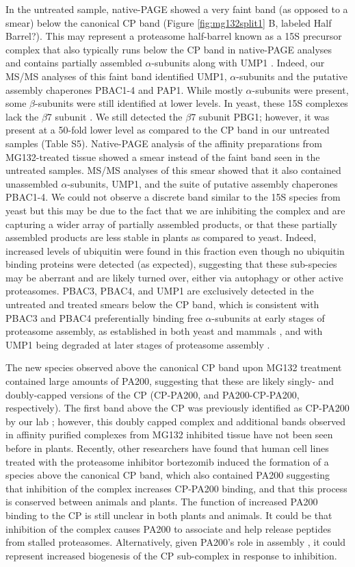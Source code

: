 In the untreated sample, native-PAGE showed a very faint band (as opposed to a smear) below the canonical CP band (Figure \ref{fig:mg132split1} B, labeled Half Barrel?). This may represent a proteasome half-barrel known as a 15S precursor complex that also typically runs below the CP band in native-PAGE analyses and contains partially assembled $\alpha$-subunits along with UMP1 \citep{kock15}. Indeed, our MS/MS analyses of this faint band identified UMP1, $\alpha$-subunits and the putative assembly chaperones PBAC1-4 and PAP1. While mostly $\alpha$-subunits were present, some $\beta$-subunits were still identified at lower levels. In yeast, these 15S complexes lack the $\beta$7 subunit \citep{kock15}. We still detected the $\beta$7 subunit PBG1; however, it was present at a 50-fold lower level as compared to the CP band in our untreated samples (Table S5). Native-PAGE analysis of the affinity preparations from MG132-treated tissue showed a smear instead of the faint band seen in the untreated samples. MS/MS analyses of this smear showed that it also contained unassembled $\alpha$-subunits, UMP1, and the suite of putative assembly chaperones PBAC1-4. We could not observe a discrete band similar to the 15S species from yeast but this may be due to the fact that we are inhibiting the complex and are capturing a wider array of partially assembled products, or that these partially assembled products are less stable in plants as compared to yeast. Indeed, increased levels of ubiquitin were found in this fraction even though no ubiquitin binding proteins were detected (as expected), suggesting that these sub-species may be aberrant and are likely turned over, either via autophagy or other active proteasomes. PBAC3, PBAC4, and UMP1 are exclusively detected in the untreated and treated smears below the CP band, which is consistent with PBAC3 and PBAC4 preferentially binding free $\alpha$-subunits at early stages of proteasome assembly, as established in both yeast and mammals \citep{kunjappu14}, and with UMP1 being degraded at later stages of proteasome assembly \citep{ramos98}.

	The new species observed above the canonical CP band upon MG132 treatment contained large amounts of PA200, suggesting that these are likely singly- and doubly-capped versions of the CP (CP-PA200, and PA200-CP-PA200, respectively). The first band above the CP was previously identified as CP-PA200 by our lab \citep{book10}; however, this doubly capped complex and additional bands observed in affinity purified complexes from MG132 inhibited tissue have not been seen before in plants. Recently, other researchers have found that human cell lines treated with the proteasome inhibitor bortezomib induced the formation of a species above the canonical CP band, which also contained PA200 \citep{welk16} suggesting that inhibition of the complex increases CP-PA200 binding, and that this process is conserved between animals and plants. The function of increased PA200 binding to the CP is still unclear in both plants and animals. It could be that inhibition of the complex causes PA200 to associate and help release peptides from stalled proteasomes. Alternatively, given PA200’s role in assembly \citep{savulescu11}, it could represent increased biogenesis of the CP sub-complex in response to inhibition.
	
